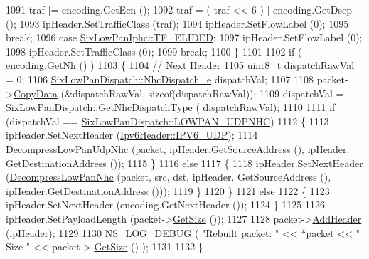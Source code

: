 \begin{DoxyCode}
1091       traf |= encoding.GetEcn ();
1092       traf = ( traf << 6 ) | encoding.GetDscp ();
1093       ipHeader.SetTrafficClass (traf);
1094       ipHeader.SetFlowLabel (0);
1095       \textcolor{keywordflow}{break};
1096     \textcolor{keywordflow}{case} \hyperlink{classns3_1_1SixLowPanIphc_ac4bbe4168668e3b0656582cfa757b7dca02b42f506e03adcd3222480f81af1dc3}{SixLowPanIphc::TF\_ELIDED}:
1097       ipHeader.SetFlowLabel (0);
1098       ipHeader.SetTrafficClass (0);
1099       \textcolor{keywordflow}{break};
1100     \}
1101 
1102   \textcolor{keywordflow}{if} ( encoding.GetNh () )
1103     \{
1104       \textcolor{comment}{// Next Header}
1105       uint8\_t dispatchRawVal = 0;
1106       \hyperlink{classns3_1_1SixLowPanDispatch_acbf93399dca3b5424dcc76de45a57f5f}{SixLowPanDispatch::NhcDispatch\_e} dispatchVal;
1107 
1108       packet->\hyperlink{classns3_1_1Packet_a5a6d304b9e0d90733919ffe224b98f0d}{CopyData} (&dispatchRawVal, \textcolor{keyword}{sizeof}(dispatchRawVal));
1109       dispatchVal = \hyperlink{classns3_1_1SixLowPanDispatch_aadc1e9ded2e292f557da546a6a4e49d2}{SixLowPanDispatch::GetNhcDispatchType} (
      dispatchRawVal);
1110 
1111       \textcolor{keywordflow}{if} (dispatchVal == \hyperlink{classns3_1_1SixLowPanDispatch_acbf93399dca3b5424dcc76de45a57f5faf1d4da6a831d704993ea3946327c8c0c}{SixLowPanDispatch::LOWPAN\_UDPNHC})
1112         \{
1113           ipHeader.SetNextHeader (\hyperlink{classns3_1_1Ipv6Header_a226429221a066c5e3b1f260caf27d1e9aef42146d6b211521c22f827b04530253}{Ipv6Header::IPV6\_UDP});
1114           \hyperlink{classns3_1_1SixLowPanNetDevice_a0b31fbe0bdc3a4dd59b9f7426aec8ed8}{DecompressLowPanUdpNhc} (packet, ipHeader.GetSourceAddress (), ipHeader.
      GetDestinationAddress ());
1115         \}
1116       \textcolor{keywordflow}{else}
1117         \{
1118           ipHeader.SetNextHeader (\hyperlink{classns3_1_1SixLowPanNetDevice_af69701425fa2e02ab4a7fdcd1db99cc8}{DecompressLowPanNhc} (packet, src, dst, ipHeader.
      GetSourceAddress (), ipHeader.GetDestinationAddress ()));
1119         \}
1120     \}
1121   \textcolor{keywordflow}{else}
1122     \{
1123       ipHeader.SetNextHeader (encoding.GetNextHeader ());
1124     \}
1125 
1126   ipHeader.SetPayloadLength (packet->\hyperlink{classns3_1_1Packet_a462855c9929954d4301a4edfe55f4f1c}{GetSize} ());
1127 
1128   packet->\hyperlink{classns3_1_1Packet_a465108c595a0bc592095cbcab1832ed8}{AddHeader} (ipHeader);
1129 
1130   \hyperlink{group__logging_ga413f1886406d49f59a6a0a89b77b4d0a}{NS\_LOG\_DEBUG} ( \textcolor{stringliteral}{"Rebuilt packet: "} << *packet << \textcolor{stringliteral}{" Size "} << packet->
      \hyperlink{classns3_1_1Packet_a462855c9929954d4301a4edfe55f4f1c}{GetSize} () );
1131 
1132 \}
\end{DoxyCode}


